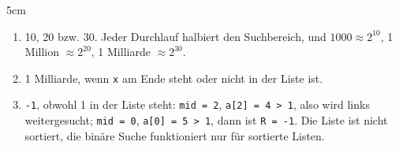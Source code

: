 \question[3]
\begin{solutionbox}{5cm}
\begin{enumerate}[label=\alph*)]
\item 10, 20 bzw. 30. Jeder Durchlauf halbiert den Suchbereich, und $1000 \approx 2^{10}$,
1 Million $\approx 2^{20}$, 1 Milliarde $\approx 2^{30}$.
\item 1 Milliarde, wenn \texttt{x} am Ende steht oder nicht in der Liste ist.
\item \texttt{-1}, obwohl 1 in der Liste steht: \texttt{mid = 2}, \texttt{a[2] = 4 > 1}, also wird links
weitergesucht; \texttt{mid = 0}, \texttt{a[0] = 5 > 1}, dann ist \texttt{R = -1}. Die Liste ist nicht sortiert,
die binäre Suche funktioniert nur für sortierte Listen.
\end{enumerate}
\end{solutionbox}
